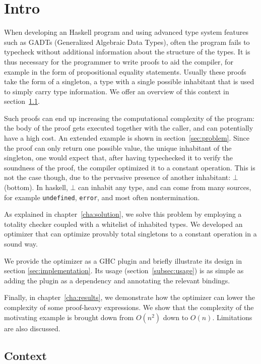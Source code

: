 \chapter{Intro}
\label{cha:intro}

When developing an Haskell program and using advanced type system features such as GADTs (Generalized Algebraic Data Types), often the program fails to typecheck without additional information about the structure of the types.
It is thus necessary for the programmer to write proofs to aid the compiler, for example in the form of propositional equality statements.
Usually these proofs take the form of a singleton, a type with a single possible inhabitant that is used to simply carry type information.
We offer an overview of this context in section~\ref{sec:context}.

Such proofs can end up increasing the computational complexity of the program: the body of the proof gets executed together with the caller, and can potentially have a high cost.
An extended example is shown in section~\ref{sec:problem}.
Since the proof can only return one possible value, the unique inhabitant of the singleton, one would expect that, after having typechecked it to verify the soundness of the proof, the compiler optimized it to a constant operation.
This is not the case though, due to the pervasive presence of another inhabitant: $\bot$ (bottom).
In haskell, $\bot$ can inhabit any type, and can come from many sources, for example \texttt{undefined}, \texttt{error}, and most often nontermination.

As explained in chapter~\ref{cha:solution}, we solve this problem by employing a totality checker coupled with a whitelist of inhabited types.
We developed an optimizer that can optimize provably total singletons to a constant operation in a sound way.

We provide the optimizer as a GHC plugin and briefly illustrate its design in section \ref{sec:implementation}.
Its usage (section~\ref{subsec:usage}) is as simple as adding the plugin as a dependency and annotating the relevant bindings.

Finally, in chapter~\ref{cha:results}, we demonstrate how the optimizer can lower the complexity of some proof-heavy expressions.
We show that the complexity of the motivating example is brought down from $O(n^2)$ down to $O(n)$.
Limitations are also discussed.

\section{Context}
\label{sec:context}

